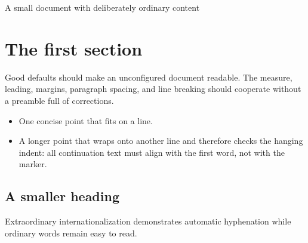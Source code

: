 \documentclass{article}
\begin{document}
\begin{center}
A small document with deliberately ordinary content
\end{center}

\section{The first section}

Good defaults should make an unconfigured document readable. The measure,
leading, margins, paragraph spacing, and line breaking should cooperate
without a preamble full of corrections.

\begin{itemize}
  \item One concise point that fits on a line.
  \item A longer point that wraps onto another line and therefore checks the
  hanging indent: all continuation text must align with the first word, not
  with the marker.
\end{itemize}

\subsection{A smaller heading}

Extraordinary internationalization demonstrates automatic hyphenation while
ordinary words remain easy to read.
\end{document}
